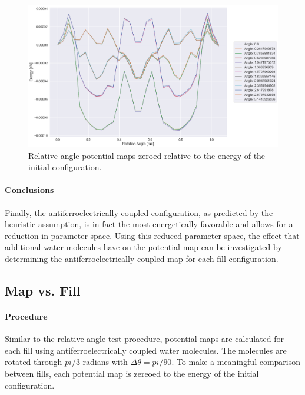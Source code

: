         \begin{figure}
            \centering
            \includegraphics[width=0.9\linewidth]{Figures/System/pmap_zeroed_relative_angle.png}
            \caption{Relative angle potential maps zeroed relative to the energy of the initial configuration.}
            \label{fig:zeroed_relative_angle_pmap}
        \end{figure}
        
        \paragraph{Conclusions} Finally, the antiferroelectrically coupled configuration, as predicted by the heuristic assumption, is in fact the most energetically favorable and allows for a reduction in parameter space. Using this reduced parameter space, the effect that additional water molecules have on the potential map can be investigated by determining the antiferroelectrically coupled map for each fill configuration.
        
        \subsection{Map vs. Fill}
        \label{sec:map_v_fill}
        
        \paragraph{Procedure} Similar to the relative angle test procedure, potential maps are calculated for each fill using antiferroelectrically coupled water molecules. The molecules are rotated through $pi/3$ radians with $\Delta \theta = pi/90$. To make a meaningful comparison between fills, each potential map is zereoed to the energy of the initial configuration.
        
